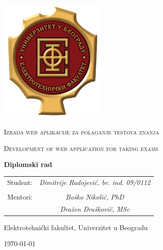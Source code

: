 \documentclass[12pt,a4paper,titlepage]{report}
\begin{document}
\begin{titlepage}
\centering
\includegraphics[width=0.4\textwidth]{etf}\par
\vspace{1cm}
{\scshape\Huge Izrada web aplikacije za polaganje testova znanja \par}
\vspace{0.5cm}
{\scshape\Large Development of web application for taking exams \par}
\vspace{1cm}
{\bfseries\large Diplomski rad \par}
\vspace{1cm}
\begin{tabularx}{0.8\textwidth}{l c}
Student: \hfill & \itshape Dimitrije Radojević, br. ind. 09/0112 \\
\hfill & \hfill \\
Mentori: \hfill & \itshape Boško Nikolić, PhD \\
\hfill & \itshape Dražen Drašković, MSc
\end{tabularx}
\vfill
{Elektrotehnički fakultet, Univerzitet u Beogradu \par}
\today
\end{titlepage}

\tableofcontents







\renewcommand\bibname{Reference}
\printbibliography
\end{document}
